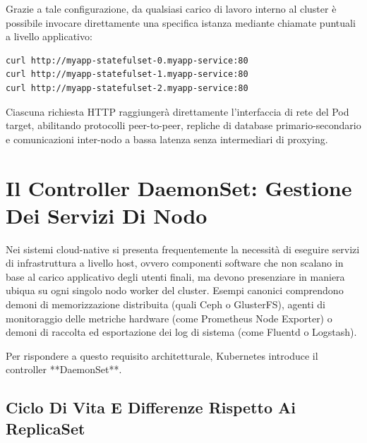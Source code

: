 \documentclass[11pt, a4paper]{article}
\begin{document}
Grazie a tale configurazione, da qualsiasi carico di lavoro interno al cluster è possibile invocare direttamente una specifica istanza mediante chiamate puntuali a livello applicativo:
\begin{lstlisting}[language=bash]
curl http://myapp-statefulset-0.myapp-service:80
curl http://myapp-statefulset-1.myapp-service:80
curl http://myapp-statefulset-2.myapp-service:80
\end{lstlisting}

Ciascuna richiesta HTTP raggiungerà direttamente l'interfaccia di rete del Pod target, abilitando protocolli peer-to-peer, repliche di database primario-secondario e comunicazioni inter-nodo a bassa latenza senza intermediari di proxying.

\newpage


\section{Il Controller DaemonSet: Gestione Dei Servizi Di Nodo}

Nei sistemi cloud-native si presenta frequentemente la necessità di eseguire servizi di infrastruttura a livello host, ovvero componenti software che non scalano in base al carico applicativo degli utenti finali, ma devono presenziare in maniera ubiqua su ogni singolo nodo worker del cluster. Esempi canonici comprendono demoni di memorizzazione distribuita (quali Ceph o GlusterFS), agenti di monitoraggio delle metriche hardware (come Prometheus Node Exporter) o demoni di raccolta ed esportazione dei log di sistema (come Fluentd o Logstash).

Per rispondere a questo requisito architetturale, Kubernetes introduce il controller **DaemonSet**.

\subsection{Ciclo Di Vita E Differenze Rispetto Ai ReplicaSet}
\end{document}
